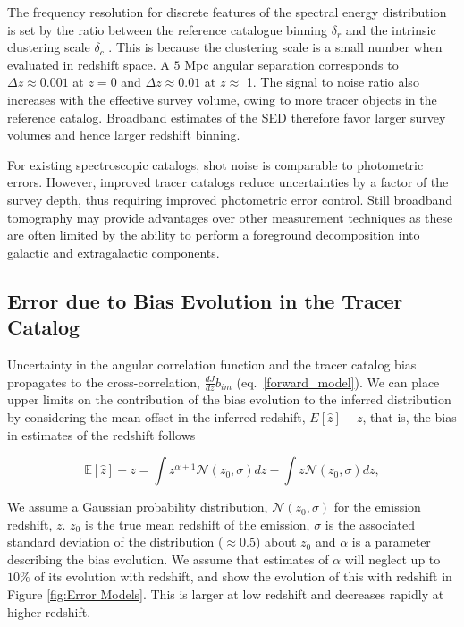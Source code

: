 \documentclass[fleqn,usenatbib]{mnras}
\begin{document}
The frequency resolution for discrete features of the spectral energy distribution is set by the ratio between the reference catalogue binning $\delta_r$ and the intrinsic clustering scale $\delta_c$ \citep{mnard2013clusteringbased}. This is because the clustering scale is a small number when evaluated in redshift space. A $5$ Mpc angular separation corresponds to $\Delta z \approx 0.001$ at $z = 0$ and $\Delta z \approx 0.01$ at $z \approx$ 1. The signal to noise ratio also increases with the effective survey volume, owing to more tracer objects in the reference catalog. Broadband estimates of the SED therefore favor larger survey volumes and hence larger redshift binning.

For existing spectroscopic catalogs, shot noise is comparable to photometric errors. However, improved tracer catalogs reduce uncertainties by a factor of the survey depth, thus requiring improved photometric error control. Still broadband tomography may provide advantages over other measurement techniques as these are often limited by the ability to perform a foreground decomposition into galactic and extragalactic components. 

\subsection{Error due to Bias Evolution in the Tracer Catalog}
\label{sec:bias_evolution_error}


Uncertainty in the angular correlation function and the tracer catalog bias propagates to the cross-correlation, $\frac{dJ}{dz} b_{im}$ (eq.~\ref{forward_model}). We can place upper limits on the contribution of the bias evolution to the inferred distribution by considering the mean offset in the inferred redshift, $E[\hat{z}] - z$, that is, the  bias in estimates of the redshift follows

\begin{equation}
\label{eqn: bias_due_to_bias}
    \mathbb{E}[\hat{z}] - z = \int z^{\alpha+1} \mathcal{N}(z_0, \sigma) dz - \int z \mathcal{N}(z_0, \sigma) dz,
\end{equation}

We assume a Gaussian probability distribution, $\mathcal{N}(z_0, \sigma)$ for the emission redshift, $z$. $z_0$ is the true mean redshift of the emission, $\sigma$ is the associated standard deviation of the distribution ($\approx 0.5$) about $z_0$ and $\alpha$ is a parameter describing the bias evolution. We assume that estimates of $\alpha$ will neglect up to $10\%$ of its evolution with redshift, and show the evolution of this with redshift in Figure \ref{fig:Error Models}.  This is larger at low redshift and decreases rapidly at higher redshift. 
\end{document}
